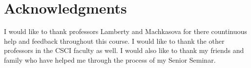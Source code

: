 \documentclass{sig-alternate}
\begin{document}

\section*{Acknowledgments}
\label{sec:acknowledgments}

I would like to thank professors Lamberty and Machkasova for there countinuous help and feedback throughout this course. I would like to thank the other professors in the CSCI faculty as well. I would also like to thank my friends and family who have helped me through the process of my Senior Seminar.



\end{document}
